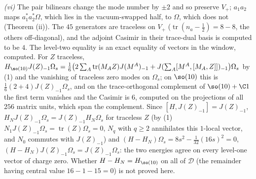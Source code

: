 \emph{(vi)} The pair bilinears change the mode number by $\pm2$ and so preserve $V_{+}$; $a_{1}a_{2}$ maps $a^{*}_{1}a^{*}_{2}\Omega$, which lies in the vacuum-swapped half, to $\Omega$, which does not (Theorem (ii)). The $45$ generators are traceless on $V_{+}$ ($\operatorname{tr}(n_{a} - \tfrac12) = 8 - 8$, the others off-diagonal), and the adjoint Casimir in their trace-dual basis is computed to be $4$. The level-two equality is an exact equality of vectors in the window, computed. For $Z$ traceless, $H_{\so(10)}J(Z)_{-1}\Omega_{s} = \tfrac16\bigl(2\sum_{A}\operatorname{tr}(M_{A}Z)J(M^{A})_{-1} + J(\textstyle\sum_{A}[M^{A}, [M_{A}, Z]])_{-1}\bigr)\Omega_{s}$ by (1) and the vanishing of traceless zero modes on $\Omega_{s}$; on $\so(10)$ this is $\tfrac16(2 + 4)J(Z)_{-1}\Omega_{s}$, and on the trace-orthogonal complement of $\so(10) + \C1$ the first term vanishes and the Casimir is $6$, computed on the projections of all $256$ matrix units, which span the complement. Since $[H, J(Z)_{-1}] = J(Z)_{-1}$, $H_{N}J(Z)_{-1}\Omega_{s} = J(Z)_{-1}H_{N}\Omega_{s}$ for traceless $Z$ (by (1) $N_{1}J(Z)_{-1}\Omega_{s} = \operatorname{tr}(Z)\Omega_{s} = 0$, $N_{q}$ with $q \ge 2$ annihilates this $1$-local vector, and $N_{0}$ commutes with $J(Z)_{-1}$) and $(H - H_{N})\Omega_{s} = 8s^{2} - \tfrac{1}{32}(16s)^{2} = 0$, $(H - H_{N})J(Z)_{-1}\Omega_{s} = J(Z)_{-1}\Omega_{s}$: the two energies agree on every level-one vector of charge zero. Whether $H - H_{N} = H_{\so(10)}$ on all of $\mathcal{D}$ (the remainder having central value $16 - 1 - 15 = 0$) is not proved here.
